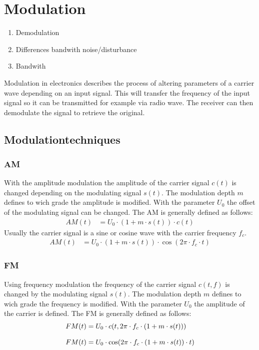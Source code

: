 \section{Modulation}\label{sec:theory:mod}

\begin{enumerate}
  \item Demodulation
  \item Differences
  \subitem bandwith
  \subitem noise/disturbance
  \item Bandwith
\end{enumerate}
%
Modulation in electronics describes the process of altering parameters of a carrier wave depending on an input signal. This will transfer the frequency of the input signal so it can be transmitted for example via radio wave. The receiver can then demodulate the signal to retrieve the original.

\subsection{Modulationtechniques}

\subsubsection*{AM}
With the amplitude modulation the amplitude of the carrier signal $c(t)$ is changed depending on the modulating signal $s(t)$. The modulation depth $m$ defines to wich grade the amplitude is modified. With the parameter $U_0$ the offset of the modulating signal can be changed.\p
The AM is generally defined as follows:
%
\begin{align}
  AM(t) &= U_0 \cdot (1 + m \cdot s(t)) \cdot c(t)
\end{align}
%
Usually the carrier signal is a sine or cosine wave with the carrier frequency $f_c$.
%
\begin{align}
  AM(t) &= U_0 \cdot (1 + m \cdot s(t)) \cdot \cos (2 \pi \cdot f_c \cdot t)
\end{align}
%
\subsubsection*{FM}
%
Using frequency modulation the frequency of the carrier signal $c(t, f)$ is changed by the modulating signal $s(t)$. The modulation depth $m$ defines to wich grade the frequency is modified. With the parameter $U_0$ the amplitude of the carrier is defined.\p
The FM is generally defined as follows:
%
\begin{align}
  FM(t) &= U_0 \cdot c(t, 2 \pi \cdot f_c \cdot (1 + m \cdot s(t)))\pmath
  FM(t) &= U_0 \cdot \cos (2 \pi \cdot f_c \cdot (1 + m \cdot s(t)) \cdot t)
\end{align}

